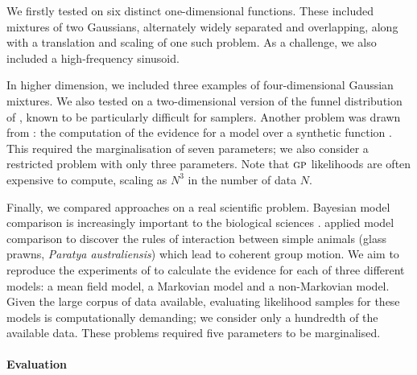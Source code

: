 \documentclass{article}
\begin{document}
We firstly tested on six distinct one-dimensional functions. These included mixtures of two Gaussians, alternately widely separated and overlapping, along with a translation and scaling of one such problem. As a challenge, we also included a high-frequency sinusoid. 

In higher dimension, we included three examples of four-dimensional Gaussian mixtures. We also tested on a two-dimensional version of the funnel distribution of \citet{neal2003slice}, known to be particularly difficult for samplers. Another problem was drawn from \citet{BZMonteCarlo}: the computation of the evidence for a \gpb model over a synthetic function \citep{friedman1991}. This required the marginalisation of seven parameters; we also consider a restricted problem with only three parameters. Note that $\gpb$ likelihoods are often expensive to compute, scaling as $N^3$ in the number of data $N$.

Finally, we compared approaches on a real scientific problem. Bayesian model comparison is increasingly important to the biological sciences 
\citep{penny2010comparing, rosa2011bayesian}. \citet{mann2012multi} applied model comparison to discover the rules of interaction between simple animals (glass prawns, {\it Paratya australiensis}) which lead to coherent group motion. We aim to reproduce the experiments of \citet{mann2012multi} to calculate the evidence for each of three different models: a mean field model, a Markovian model and a non-Markovian model. Given the large corpus of data available, evaluating likelihood samples for these models is computationally demanding; we consider only a hundredth of the available data. These problems required five parameters to be marginalised. 


\paragraph{Evaluation}
\end{document}
